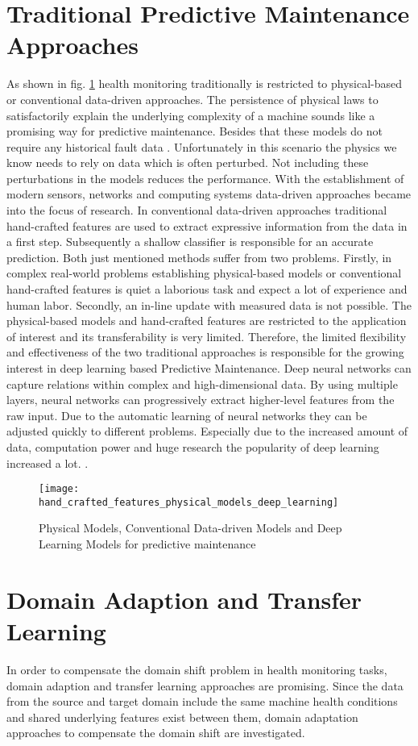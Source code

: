 \section{Traditional Predictive Maintenance Approaches}
As shown in fig. \ref{fig:hand_crafted_features_physical_models_deep_learning} health monitoring traditionally is restricted to physical-based or conventional data-driven approaches. The persistence of  physical laws to satisfactorily explain the underlying complexity of a machine sounds like a promising way for predictive maintenance. Besides that these models do not require any historical fault data \cite{AN201942}. Unfortunately in this scenario the physics we know needs to rely on data which is often perturbed. Not including these perturbations in the models reduces the performance. With the establishment of modern sensors, networks and computing systems data-driven approaches became into the focus of research. In conventional data-driven approaches traditional hand-crafted features are used to extract expressive information from the data in a first step. Subsequently a shallow classifier is responsible for an accurate prediction. Both just mentioned methods suffer from two problems. Firstly, in complex real-world problems establishing physical-based models or conventional hand-crafted features is quiet a laborious task and expect a lot of experience and human labor. Secondly, an in-line update with measured data is not possible. The physical-based models and hand-crafted features are restricted to the application of interest and its transferability is very limited. Therefore, the limited flexibility and effectiveness of the two traditional approaches is responsible for the growing interest in deep learning based Predictive Maintenance. Deep neural networks can capture relations within complex and high-dimensional data. By using multiple layers, neural networks can progressively extract higher-level features from the raw input. Due to the automatic learning of neural networks they can be adjusted quickly to different problems. Especially due to the increased amount of data, computation power and huge research the popularity of deep learning increased a lot.  \cite{ZHAO2019213} \cite{AZAMFAR2020103932}. 

\begin{figure}[htpb]
  \centering
  \texttt{[image: hand\_crafted\_features\_physical\_models\_deep\_learning]}
  \caption {Physical Models, Conventional Data-driven Models and Deep Learning Models for predictive maintenance \cite{ZHAO2019213}} \label{fig:hand_crafted_features_physical_models_deep_learning}
\end{figure}

\section{Domain Adaption and Transfer Learning}
In order to compensate the domain shift problem in health monitoring tasks, domain adaption and transfer learning approaches are promising. Since the data from the source and target domain include the same machine health conditions and shared underlying features exist between them, domain adaptation approaches to compensate the domain shift are investigated. 